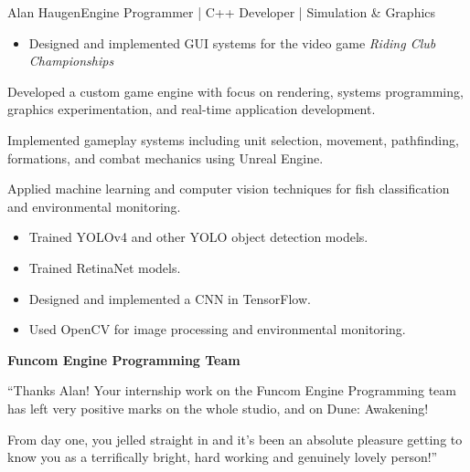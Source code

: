 \documentclass{article}
\begin{document}
\begin{cv}[avatar]{Alan Haugen}{Engine Programmer | C++ Developer | Simulation \& Graphics}
\begin{cvevent}[2007][2008]

    \begin{itemize}
        \item Designed and implemented GUI systems for the video game \emph{Riding Club Championships}
    \end{itemize}
\end{cvevent}


\begin{cvevent}

    Developed a custom game engine with focus on rendering, systems programming, graphics experimentation, and real-time application development.
\end{cvevent}

\begin{cvevent}

    Implemented gameplay systems including unit selection, movement, pathfinding, formations, and combat mechanics using Unreal Engine.
\end{cvevent}

\begin{cvevent}

    Applied machine learning and computer vision techniques for fish classification and environmental monitoring.
    \begin{itemize}
        \item Trained YOLOv4 and other YOLO object detection models.
        \item Trained RetinaNet models.
        \item Designed and implemented a CNN in TensorFlow.
        \item Used OpenCV for image processing and environmental monitoring.
    \end{itemize}
\end{cvevent}


\begin{cvevent}
\textbf{Funcom Engine Programming Team}

``Thanks Alan! Your internship work on the Funcom Engine Programming team has left very positive marks on the whole studio, and on Dune: Awakening!

From day one, you jelled straight in and it’s been an absolute pleasure getting to know you as a terrifically bright, hard working and genuinely lovely person!''
\end{cvevent}


\end{cv}
\end{document}
